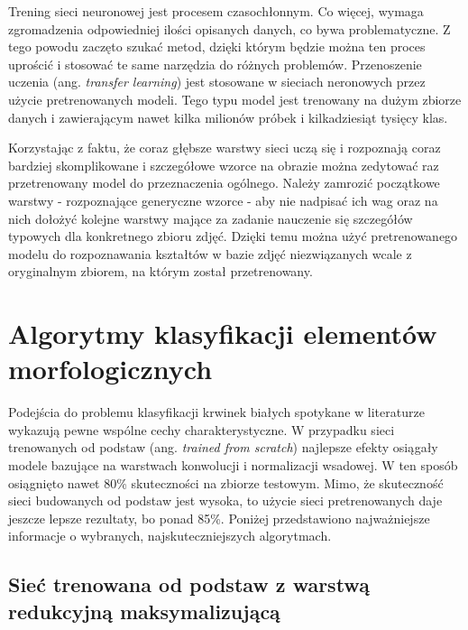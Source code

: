 Trening sieci neuronowej jest procesem czasochłonnym. Co więcej, wymaga zgromadzenia odpowiedniej ilości opisanych danych, co bywa problematyczne. Z tego powodu zaczęto szukać metod, dzięki którym będzie można ten proces uprościć i stosować te same narzędzia do różnych problemów. Przenoszenie uczenia (ang. \textit{transfer learning}) jest stosowane w sieciach neronowych przez użycie pretrenowanych modeli. Tego typu model jest trenowany na dużym zbiorze danych i zawierającym nawet kilka milionów próbek i kilkadziesiąt tysięcy klas. 

{\parindent0pt %
Korzystając z faktu, że coraz głębsze warstwy sieci uczą się i rozpoznają coraz bardziej skomplikowane i szczegółowe wzorce na obrazie można zedytować raz przetrenowany model do przeznaczenia ogólnego. Należy zamrozić początkowe warstwy - rozpoznające generyczne wzorce - aby nie nadpisać ich wag oraz na nich dołożyć kolejne warstwy mające za zadanie nauczenie się szczegółów typowych dla konkretnego zbioru zdjęć. Dzięki temu można użyć pretrenowanego modelu do rozpoznawania kształtów w bazie zdjęć niezwiązanych wcale z oryginalnym zbiorem, na którym został przetrenowany. 
}

\section{Algorytmy klasyfikacji elementów morfologicznych}

Podejścia do problemu klasyfikacji krwinek białych spotykane w literaturze wykazują pewne wspólne cechy charakterystyczne. W przypadku sieci trenowanych od podstaw (ang. \textit{trained from scratch}) najlepsze efekty osiągały modele bazujące na warstwach konwolucji i normalizacji wsadowej. W ten sposób osiągnięto nawet 80\% skuteczności na zbiorze testowym. Mimo, że skuteczność sieci budowanych od podstaw jest wysoka, to użycie sieci pretrenowanych daje jeszcze lepsze rezultaty, bo ponad 85\%. Poniżej przedstawiono najważniejsze informacje o wybranych, najskuteczniejszych algorytmach.

\subsection{Sieć trenowana od podstaw z warstwą redukcyjną maksymalizującą}
\label{section_kaggle_1}


